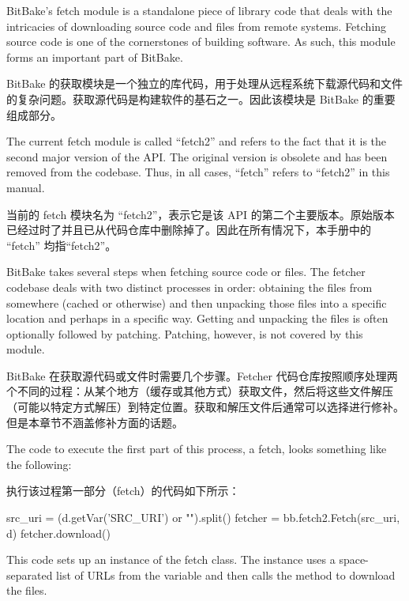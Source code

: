 
BitBake's fetch module is a standalone piece of library code that deals with the intricacies of downloading source code and files from remote systems. Fetching source code is one of the cornerstones of building software. As such, this module forms an important part of BitBake.

BitBake 的获取模块是一个独立的库代码，用于处理从远程系统下载源代码和文件的复杂问题。获取源代码是构建软件的基石之一。因此该模块是 BitBake 的重要组成部分。

The current fetch module is called ``fetch2'' and refers to the fact that it is the second major version of the API. The original version is obsolete and has been removed from the codebase. Thus, in all cases, ``fetch'' refers to ``fetch2'' in this manual.

当前的 fetch 模块名为 ``fetch2''，表示它是该 API 的第二个主要版本。原始版本已经过时了并且已从代码仓库中删除掉了。因此在所有情况下，本手册中的 ``fetch'' 均指``fetch2''。


BitBake takes several steps when fetching source code or files. The fetcher codebase deals with two distinct processes in order: obtaining the files from somewhere (cached or otherwise) and then unpacking those files into a specific location and perhaps in a specific way. Getting and unpacking the files is often optionally followed by patching. Patching, however, is not covered by this module.

BitBake 在获取源代码或文件时需要几个步骤。Fetcher 代码仓库按照顺序处理两个不同的过程：从某个地方（缓存或其他方式）获取文件，然后将这些文件解压（可能以特定方式解压）到特定位置。获取和解压文件后通常可以选择进行修补。但是本章节不涵盖修补方面的话题。

The code to execute the first part of this process, a fetch, looks something like the following:

执行该过程第一部分（fetch）的代码如下所示：

\begin{pyglist}
src_uri = (d.getVar('SRC_URI') or "").split()
fetcher = bb.fetch2.Fetch(src_uri, d)
fetcher.download()
\end{pyglist}

This code sets up an instance of the fetch class. The instance uses a space-separated list of URLs from the  variable and then calls the  method to download the files.

